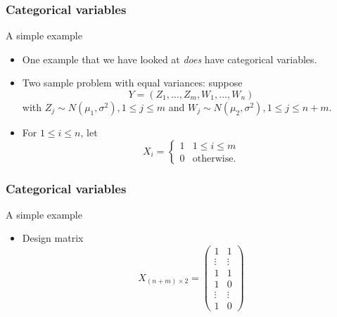 \documentclass[handout]{beamer}
\begin{document}

   \begin{frame} \frametitle{Categorical variables}

   \begin{block}
   {A simple example}
   \begin{itemize}

   \item       One example that we have looked at
   {\em does} have categorical variables.

   \item Two sample problem with equal variances:
   suppose
   $$
   Y = (Z_1, \dots, Z_m, W_1, \dots, W_n)$$
   with $Z_j \sim N(\mu_1, \sigma^2), 1 \leq j \leq m$ and $W_j \sim N(\mu_2, \sigma^2), 1 \leq j \leq n + m$.

   \item For  $1 \leq i \leq n$, let
   $$
   X_i =
   \begin{cases}
   1 & 1 \leq i \leq m \\
   0 & \text{otherwise.}
   \end{cases}
   $$
   \end{itemize}
   \end{block}
   \end{frame}


   \begin{frame} \frametitle{Categorical variables}

   \begin{block}
   {A simple example}
   \begin{itemize}

   \item Design matrix
   $$
   X_{(n+m) \times 2} =
   \begin{pmatrix}
   1 & 1 \\
   \vdots & \vdots \\
   1 & 1 \\
   1 & 0 \\
   \vdots & \vdots \\
   1 & 0
   \end{pmatrix}
   $$
   \end{itemize}
   \end{block}
   \end{frame}

\end{document}
